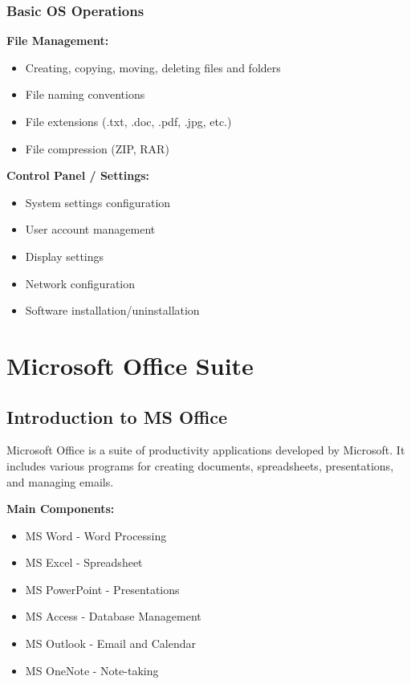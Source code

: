 \documentclass[12pt,a4paper]{article}
\begin{document}
\subsubsection{Basic OS Operations}

\textbf{File Management:}
\begin{itemize}
    \item Creating, copying, moving, deleting files and folders
    \item File naming conventions
    \item File extensions (.txt, .doc, .pdf, .jpg, etc.)
    \item File compression (ZIP, RAR)
\end{itemize}

\textbf{Control Panel / Settings:}
\begin{itemize}
    \item System settings configuration
    \item User account management
    \item Display settings
    \item Network configuration
    \item Software installation/uninstallation
\end{itemize}

\newpage


\section{Microsoft Office Suite}

\subsection{Introduction to MS Office}
Microsoft Office is a suite of productivity applications developed by Microsoft. It includes various programs for creating documents, spreadsheets, presentations, and managing emails.

\textbf{Main Components:}
\begin{itemize}
    \item MS Word - Word Processing
    \item MS Excel - Spreadsheet
    \item MS PowerPoint - Presentations
    \item MS Access - Database Management
    \item MS Outlook - Email and Calendar
    \item MS OneNote - Note-taking
\end{itemize}
\end{document}
